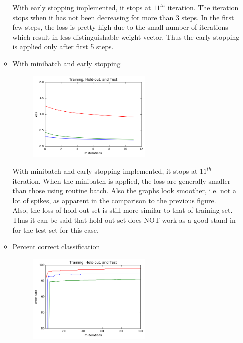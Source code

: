 \documentclass[11pt,twoside]{article}
\begin{document}
\begin{enumerate}[label=(\alph*)]
\begin{itemize}
  With early stopping implemented, it stops at $11^{th}$ iteration. The iteration stops when it has not been decreasing for more than 3 steps. In the first few steps, the loss is pretty high due to the small number of iterations which result in less distinguishable weight vector. Thus the early stopping is applied only after first 5 steps.\\
  
  \item With minibatch and early stopping
  
  \begin{figure}[H]
  \includegraphics[width=0.6\textwidth]{cstop_mini_all_loss}
  \centering
  \caption{}
  \label{fig:4_2}
  \end{figure}
  
  With minibatch and early stopping implemented, it stops at $11^{th}$ iteration. When the minibatch is applied, the loss are generally smaller than those using routine batch. Also the graphs look smoother, i.e. not a lot of spikes, as apparent in the comparison to the previous figure.\\
  
  Also, the loss of hold-out set is still more similar to that of training set. Thus it can be said that hold-out set does NOT work as a good stand-in for the test set for this case.\\

  \item Percent correct classification
  
  \begin{figure}[H]
  \includegraphics[width=0.6\textwidth]{cacc_all}
  \centering
  \caption{}
  \label{fig:4_2}
  \end{figure}


\end{itemize}
\end{enumerate}
\end{document}
